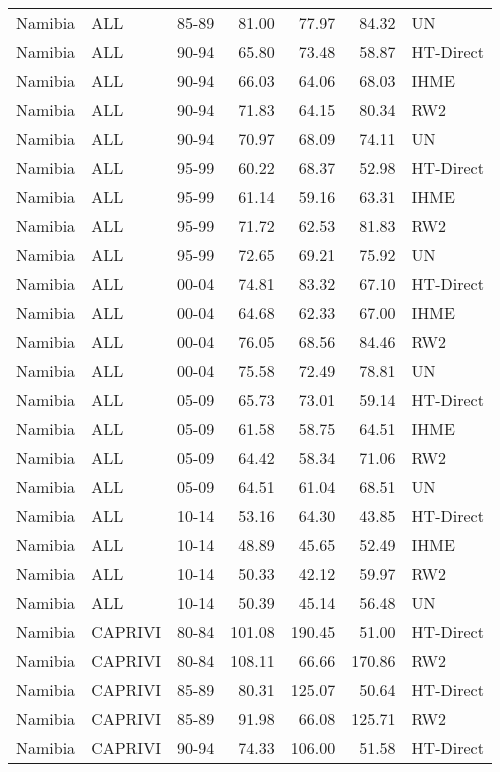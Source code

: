 \begin{longtable}{lllrrrl}
  Namibia & ALL & 85-89 & 81.00 & 77.97 & 84.32 & UN \\ 
  Namibia & ALL & 90-94 & 65.80 & 73.48 & 58.87 & HT-Direct \\ 
  Namibia & ALL & 90-94 & 66.03 & 64.06 & 68.03 & IHME \\ 
  Namibia & ALL & 90-94 & 71.83 & 64.15 & 80.34 & RW2 \\ 
  Namibia & ALL & 90-94 & 70.97 & 68.09 & 74.11 & UN \\ 
  Namibia & ALL & 95-99 & 60.22 & 68.37 & 52.98 & HT-Direct \\ 
  Namibia & ALL & 95-99 & 61.14 & 59.16 & 63.31 & IHME \\ 
  Namibia & ALL & 95-99 & 71.72 & 62.53 & 81.83 & RW2 \\ 
  Namibia & ALL & 95-99 & 72.65 & 69.21 & 75.92 & UN \\ 
  Namibia & ALL & 00-04 & 74.81 & 83.32 & 67.10 & HT-Direct \\ 
  Namibia & ALL & 00-04 & 64.68 & 62.33 & 67.00 & IHME \\ 
  Namibia & ALL & 00-04 & 76.05 & 68.56 & 84.46 & RW2 \\ 
  Namibia & ALL & 00-04 & 75.58 & 72.49 & 78.81 & UN \\ 
  Namibia & ALL & 05-09 & 65.73 & 73.01 & 59.14 & HT-Direct \\ 
  Namibia & ALL & 05-09 & 61.58 & 58.75 & 64.51 & IHME \\ 
  Namibia & ALL & 05-09 & 64.42 & 58.34 & 71.06 & RW2 \\ 
  Namibia & ALL & 05-09 & 64.51 & 61.04 & 68.51 & UN \\ 
  Namibia & ALL & 10-14 & 53.16 & 64.30 & 43.85 & HT-Direct \\ 
  Namibia & ALL & 10-14 & 48.89 & 45.65 & 52.49 & IHME \\ 
  Namibia & ALL & 10-14 & 50.33 & 42.12 & 59.97 & RW2 \\ 
  Namibia & ALL & 10-14 & 50.39 & 45.14 & 56.48 & UN \\ 
  Namibia & CAPRIVI & 80-84 & 101.08 & 190.45 & 51.00 & HT-Direct \\ 
  Namibia & CAPRIVI & 80-84 & 108.11 & 66.66 & 170.86 & RW2 \\ 
  Namibia & CAPRIVI & 85-89 & 80.31 & 125.07 & 50.64 & HT-Direct \\ 
  Namibia & CAPRIVI & 85-89 & 91.98 & 66.08 & 125.71 & RW2 \\ 
  Namibia & CAPRIVI & 90-94 & 74.33 & 106.00 & 51.58 & HT-Direct \\ 

\end{longtable}
